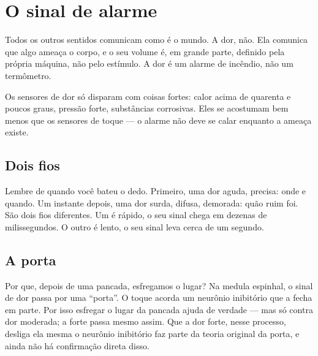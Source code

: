 \chapter{O sinal de alarme}


Todos os outros sentidos comunicam como é o mundo. A dor, não. Ela comunica que algo ameaça o corpo, e o seu volume é, em grande parte, definido pela própria máquina, não pelo estímulo. A dor é um alarme de incêndio, não um termômetro.

Os sensores de dor só disparam com coisas fortes: calor acima de quarenta e poucos graus, pressão forte, substâncias corrosivas. Eles se acostumam bem menos que os sensores de toque --- o alarme não deve se calar enquanto a ameaça existe.

\section*{Dois fios}

Lembre de quando você bateu o dedo. Primeiro, uma dor aguda, precisa: onde e quando. Um instante depois, uma dor surda, difusa, demorada: quão ruim foi. São dois fios diferentes. Um é rápido, o seu sinal chega em dezenas de milissegundos. O outro é lento, o seu sinal leva cerca de um segundo.

\section*{A porta}

Por que, depois de uma pancada, esfregamos o lugar? Na medula espinhal, o sinal de dor passa por uma ``porta''. O toque acorda um neurônio inibitório que a fecha em parte. Por isso esfregar o lugar da pancada ajuda de verdade --- mas só contra dor moderada; a forte passa mesmo assim. Que a dor forte, nesse processo, desliga ela mesma o neurônio inibitório faz parte da teoria original da porta, e ainda não há confirmação direta disso.


